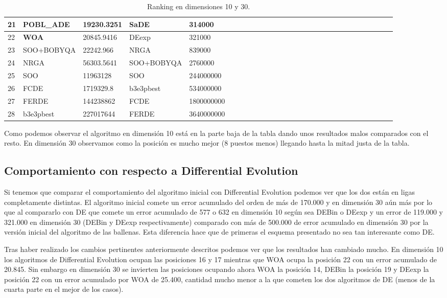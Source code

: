 \documentclass[12pt,a4paper]{article}
\begin{document}
\begin{table}[!h]
{\begin{tabular}{ | l | l | l | l | l | l | l | l | l | l | l | l | l | l | l | l | l | l | l | l | l | l | l | l  |l | l  |l | l | }
				21 & POBL\_ADE & 19230.3251 & SaDE & 314000 \\ \hline
				22 & \textbf{WOA} & 20845.9416 & DEexp & 321000 \\ \hline
				23 & SOO+BOBYQA & 22242.966 & NRGA & 839000 \\ \hline
				24 & NRGA & 56303.5641 & SOO+BOBYQA & 2760000 \\ \hline
				25 & SOO & 11963128 & SOO & 244000000 \\ \hline
				26 & FCDE & 1719329.8 & b3e3pbest & 534000000 \\ \hline
				27 & FERDE & 144238862 & FCDE & 1800000000 \\ \hline
				28 & b3e3pbest & 227017644 & FERDE & 3640000000 \\ \hline
			\end{tabular}
		}
		\label{Ranking}
		\caption{Ranking en dimensiones 10 y 30.}
	\end{table}

	Como podemos observar el algoritmo en dimensión 10 está en la parte baja de la tabla dando unos resultados malos comparados con el resto. En dimensión 30 observamos como la posición es mucho mejor (8 puestos menos) llegando hasta la mitad justa de la tabla.
	
	\subsection{Comportamiento con respecto a Differential Evolution}
	
	Si tenemos que comparar el comportamiento del algoritmo inicial con Differential Evolution podemos ver que los dos están en ligas completamente distintas. El algoritmo inicial comete un error acumulado del orden de más de 170.000 y en dimensión 30 aún más por lo que al compararlo con DE que comete un error acumulado de 577 o 632 en dimensión 10 según sea DEBin o DEexp y un error de 119.000 y 321.000 en dimensión 30 (DEBin y DEexp respectivamente) comparado con más de 500.000 de error acumulado en dimensión 30 por la versión inicial del algoritmo de las ballenas. Esta diferencia hace que de primeras el esquema presentado no sea tan interesante como DE.
	
	Tras haber realizado los cambios pertinentes anteriormente descritos podemos ver que los resultados han cambiado mucho. En dimensión 10 los algoritmos de Differential Evolution ocupan las posiciones 16 y 17 mientras que WOA ocupa la posición 22 con un error acumulado de 20.845. Sin embargo en dimensión 30 se invierten las posiciones ocupando ahora WOA la posición 14, DEBin la posición 19 y DEexp la posición 22 con un error acumulado por WOA de 25.400, cantidad mucho menor a la que cometen los dos algoritmos de DE (menos de la cuarta parte en el mejor de los casos).
	
\end{document}
